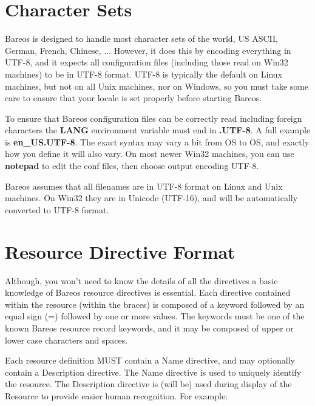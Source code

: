 \section{Character Sets}
Bareos is designed to handle most character sets of the world,
US ASCII, German, French, Chinese, ...  However, it does this by
encoding everything in UTF-8, and it expects all configuration files
(including those read on Win32 machines) to be in UTF-8 format.
UTF-8 is typically the default on Linux machines, but not on all
Unix machines, nor on Windows, so you must take some care to ensure
that your locale is set properly before starting Bareos.

To ensure that Bareos configuration files can be correctly read including
foreign characters the {\bf LANG} environment variable
must end in {\bf .UTF-8}. A full example is {\bf en\_US.UTF-8}. The
exact syntax may vary a bit from OS to OS, and exactly how you define
it will also vary.  On most newer Win32 machines, you can use {\bf notepad}
to edit the conf files, then choose output encoding UTF-8.

Bareos assumes that all filenames are in UTF-8 format on Linux and
Unix machines. On Win32 they are in Unicode (UTF-16), and will
be automatically converted to UTF-8 format.

\section{Resource Directive Format}

Although, you won't need to know the details of all the directives a basic
knowledge of Bareos resource directives is essential. Each directive contained
within the resource (within the braces) is composed of a keyword followed by
an equal sign (=) followed by one or more values. The keywords must be one of
the known Bareos resource record keywords, and it may be composed of upper or
lower case characters and spaces.

Each resource definition MUST contain a Name directive, and may optionally
contain a Description directive. The Name directive is used to
uniquely identify the resource. The Description directive is (will be) used
during display of the Resource to provide easier human recognition. For
example:

\hide{$}

